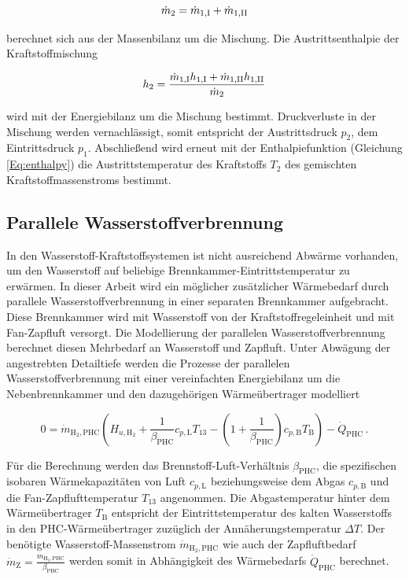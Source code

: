 \begin{equation}\label{Eq:mass}
	\dot{m}_2 = \dot{m}_{1,\mathrm{\rom{1}}}+\dot{m}_{1,\mathrm{\rom{2}}}
\end{equation}

berechnet sich aus der Massenbilanz um die Mischung. Die Austrittsenthalpie der Kraftstoffmischung 

\begin{equation}\label{Eq:energy-mix}
	h_{2} = \frac{\dot{m}_{1,\mathrm{\rom{1}}}h_{1,\mathrm{\rom{1}}}+\dot{m}_{1,\mathrm{\rom{2}}}h_{1,\mathrm{\rom{2}}}}{\dot{m}_2}
\end{equation}

wird mit der Energiebilanz um die Mischung bestimmt. Druckverluste in der Mischung werden vernachlässigt, somit entspricht der Austrittsdruck $p_2$, dem Eintrittsdruck $p_1$. Abschließend wird erneut mit der Enthalpiefunktion (Gleichung \ref{Eq:enthalpy}) die Austrittstemperatur des Kraftstoffs $T_2$ des gemischten Kraftstoffmassenstroms bestimmt. 

\subsection{Parallele Wasserstoffverbrennung}

In den Wasserstoff-Kraftstoffsystemen ist nicht ausreichend Abwärme vorhanden, um den Wasserstoff auf beliebige Brennkammer-Eintrittstemperatur zu erwärmen. In dieser Arbeit wird ein möglicher zusätzlicher Wärmebedarf durch parallele Wasserstoffverbrennung in einer separaten Brennkammer aufgebracht. Diese Brennkammer wird mit Wasserstoff von der Kraftstoffregeleinheit und mit Fan-Zapfluft versorgt. Die Modellierung der parallelen Wasserstoffverbrennung berechnet diesen Mehrbedarf an Wasserstoff und Zapfluft. Unter Abwägung der angestrebten Detailtiefe werden die Prozesse der parallelen Wasserstoffverbrennung mit einer vereinfachten Energiebilanz um die Nebenbrennkammer und den dazugehörigen Wärmeübertrager modelliert 

\begin{equation}\label{Eq:phc}
	0 = \dot{m}_{\mathrm{H}_2, \mathrm{PHC}}\left(H_{u, \mathrm{H}_2} + \frac{1}{\beta_\mathrm{PHC}}c_{p,\mathrm{L}} T_{13} - \left(1+\frac{1}{\beta_\mathrm{PHC}}\right)c_{p,\mathrm{B}} T_\mathrm{B}\right)-\dot{Q}_\mathrm{PHC}\,.
\end{equation}

Für die Berechnung werden das Brennstoff-Luft-Verhältnis $\beta_\mathrm{PHC}$, die spezifischen isobaren Wärmekapazitäten von Luft $c_{p,\mathrm{L}}$ beziehungsweise dem Abgas $c_{p,\mathrm{B}}$ und die Fan-Zapflufttemperatur $T_{13}$ angenommen. Die Abgastemperatur hinter dem Wärmeübertrager $T_\mathrm{B}$ entspricht der Eintrittstemperatur des kalten Wasserstoffs in den PHC-Wärmeübertrager zuzüglich der Annäherungstemperatur $\Delta T$. Der benötigte Wasserstoff-Massenstrom $\dot{m}_{\mathrm{H}_2, \mathrm{PHC}}$ wie auch der Zapfluftbedarf $\dot{m}_\mathrm{Z} = \frac{\dot{m}_{\mathrm{H}_2, \mathrm{PHC}}}{\beta_\mathrm{PHC}}$ werden somit in Abhängigkeit des Wärmebedarfs $\dot{Q}_\mathrm{PHC}$ berechnet.

